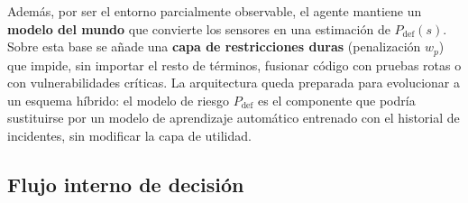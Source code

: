 \documentclass[11pt,a4paper]{article}
\newcommand{\Pdef}{P_{\text{def}}}
\begin{document}
Además, por ser el entorno parcialmente observable, el agente mantiene un \textbf{modelo del mundo}
que convierte los sensores en una estimación de $\Pdef(s)$. Sobre esta base se añade una \textbf{capa
de restricciones duras} (penalización $w_p$) que impide, sin importar el resto de términos, fusionar
código con pruebas rotas o con vulnerabilidades críticas. La arquitectura queda preparada para
evolucionar a un esquema híbrido: el modelo de riesgo $\Pdef$ es el componente que podría sustituirse
por un modelo de aprendizaje automático entrenado con el historial de incidentes, sin modificar la
capa de utilidad.

\subsection{Flujo interno de decisión}
\end{document}
